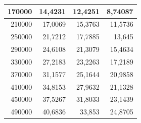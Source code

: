 \documentclass[a4paper, 12pt]{article}
\begin{document}
\begin{longtable}[c]{@{}rrrr@{}}
	\multicolumn{1}{|r|}{170000}                  & \multicolumn{1}{r|}{14,4231}                & \multicolumn{1}{r|}{12,4251}                                                           & \multicolumn{1}{r|}{8,74087}                                                           \\* \midrule
	\multicolumn{1}{|r|}{210000}                  & \multicolumn{1}{r|}{17,0069}                & \multicolumn{1}{r|}{15,3763}                                                           & \multicolumn{1}{r|}{11,5736}                                                           \\* \midrule
	\multicolumn{1}{|r|}{250000}                  & \multicolumn{1}{r|}{21,7212}                & \multicolumn{1}{r|}{17,7885}                                                           & \multicolumn{1}{r|}{13,645}                                                            \\* \midrule
	\multicolumn{1}{|r|}{290000}                  & \multicolumn{1}{r|}{24,6108}                & \multicolumn{1}{r|}{21,3079}                                                           & \multicolumn{1}{r|}{15,4634}                                                           \\* \midrule
	\multicolumn{1}{|r|}{330000}                  & \multicolumn{1}{r|}{27,2183}                & \multicolumn{1}{r|}{23,2263}                                                           & \multicolumn{1}{r|}{17,2189}                                                           \\* \midrule
	\multicolumn{1}{|r|}{370000}                  & \multicolumn{1}{r|}{31,1577}                & \multicolumn{1}{r|}{25,1644}                                                           & \multicolumn{1}{r|}{20,9858}                                                           \\* \midrule
	\multicolumn{1}{|r|}{410000}                  & \multicolumn{1}{r|}{34,8153}                & \multicolumn{1}{r|}{27,9632}                                                           & \multicolumn{1}{r|}{21,1328}                                                           \\* \midrule
	\multicolumn{1}{|r|}{450000}                  & \multicolumn{1}{r|}{37,5267}                & \multicolumn{1}{r|}{31,8033}                                                           & \multicolumn{1}{r|}{23,1439}                                                           \\* \midrule
	\multicolumn{1}{|r|}{490000}                  & \multicolumn{1}{r|}{40,6836}                & \multicolumn{1}{r|}{33,853}                                                            & \multicolumn{1}{r|}{24,8705}                                                           \\* \midrule

\end{longtable}
\end{document}
